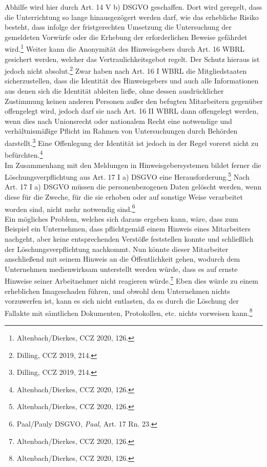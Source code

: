 Abhilfe wird hier durch Art. 14 V b) DSGVO geschaffen.
Dort wird geregelt, dass die Unterrichtung so lange hinausgezögert werden darf, wie das erhebliche Risiko besteht, dass infolge der fristgerechten Umsetzung die Untersuchung der gemeldeten Vorwürfe oder die Erhebung der erforderlichen Beweise gefährdet wird.\footnote{Altenbach/Dierkes, CCZ 2020, 126.}
Weiter kann die Anonymität des Hinweisgebers durch Art. 16 WBRL gesichert werden, welcher das Vertraulichkeitsgebot regelt. 
Der Schutz hieraus ist jedoch nicht absolut.\footnote{Dilling, CCZ 2019, 214.}
Zwar haben nach Art. 16 I WBRL die Mitgliedstaaten sicherzustellen, dass die Identität des Hinweisgebers und auch alle Informationen aus denen sich die Identität ableiten ließe, ohne dessen ausdrücklicher Zustimmung keinen anderen Personen außer den befugten Mitarbeitern gegenüber offengelegt wird, jedoch darf sie nach Art. 16 II WBRL dann offengelegt werden, wenn dies nach Unionsrecht oder nationalem Recht eine notwendige und verhältnismäßige Pflicht im Rahmen von Untersuchungen durch Behörden darstellt.\footnote{Dilling, CCZ 2019, 214.}
Eine Offenlegung der Identität ist jedoch in der Regel vorerst nicht zu befürchten.\footnote{Altenbach/Dierkes, CCZ 2020, 126.}\\
Im Zusammenhang mit den Meldungen in Hinweisgebersystemen bildet  ferner die Löschungsverpflichtung aus Art. 17 I a) DSGVO eine Herausforderung.\footnote{Altenbach/Dierkes, CCZ 2020, 126.}
Nach Art. 17 I a) DSGVO müssen die personenbezogenen Daten gelöscht werden, wenn diese für die Zweche, für die sie erhoben oder auf sonstige Weise verarbeitet worden sind, nicht mehr notwendig sind.\footnote{Paal/Pauly DSGVO, \textit{Paal}, Art. 17 Rn. 23.}\\
Ein mögliches Problem, welches sich daraus ergeben kann, wäre, dass zum Beispiel ein Unternehmen, dass pflichtgemäß einem Hinweis eines Mitarbeiters nachgeht, aber keine entsprechenden Verstöße feststellen konnte und schließlich der Löschungsverpflichtung nachkommt. 
Nun könnte dieser Mitarbeiter anschließend mit seinem Hinweis an die Öffentlichkeit gehen, wodurch dem Unternehmen medienwirksam unterstellt werden würde, dass es auf ernste Hinweise seiner Arbeitnehmer nicht reagieren würde.\footnote{Altenbach/Dierkes, CCZ 2020, 126.}
Eben dies würde zu einem erheblichen Imageschaden führen, und obwohl dem Unternehmen nichts vorzuwerfen ist, kann es sich nicht entlasten, da es durch die Löschung der Fallakte mit sämtlichen Dokumenten, Protokollen, etc. nichts vorweisen kann.\footnote{Altenbach/Dierkes, CCZ 2020, 126.}\\
